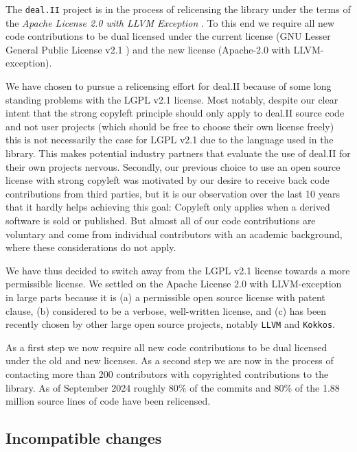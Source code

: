 \documentclass{ansarticle-preprint}
\newcommand{\specialword}[1]{\texttt{#1}}
\newcommand{\dealii}{{\specialword{deal.II}}\xspace}
\newcommand{\kokkos}{{\specialword{Kokkos}}\xspace}
\newcommand{\llvm}{{\specialword{LLVM}}\xspace}
\begin{document}
The \dealii project is in the process of relicensing the library under the
terms of the \emph{Apache License 2.0 with LLVM
Exception} \cite{Apache-2.0,LLVM-Exception}. To this end we require all new
code contributions to be dual licensed under the current license (GNU
Lesser General Public License v2.1 \cite{LGPL-2.1}) and the new license
(Apache-2.0 with LLVM-exception).

We have chosen to pursue a relicensing effort for deal.II because of some
long standing problems with the LGPL v2.1 license. Most notably, despite
our clear intent that the strong copyleft principle should only apply to
deal.II source code and not user projects (which should be free to choose
their own license freely) this is not necessarily the case for LGPL v2.1
due to the language used in the library. This makes potential industry
partners that evaluate the use of deal.II for their own projects nervous.
Secondly, our previous choice to use an open source license with strong
copyleft was motivated by our desire to receive back code contributions
from third parties, but it is our observation over the last 10 years that
it hardly helps achieving this goal: Copyleft only applies when a derived
software is sold or published. But almost all of our code contributions are
voluntary and come from individual contributors with an academic
background, where these considerations do not apply.

We have thus decided to switch away from the LGPL v2.1 license towards a
more permissible license. We settled on the Apache License 2.0 with
LLVM-exception in large parts because it is (a) a permissible open source
license with patent clause, (b) considered to be a verbose, well-written
license, and (c) has been recently chosen by other large open source
projects, notably \llvm{} and \kokkos{}.

As a first step we now require all new code contributions to be dual
licensed under the old and new licenses. As a second step we are now in the
process of contacting more than 200 contributors with copyrighted
contributions to the library. As of September 2024 roughly 80\% of the
commits and 80\% of the 1.88 million source lines of code have been
relicensed.

\subsection{Incompatible changes}\label{subsec:deprecated}
\end{document}
